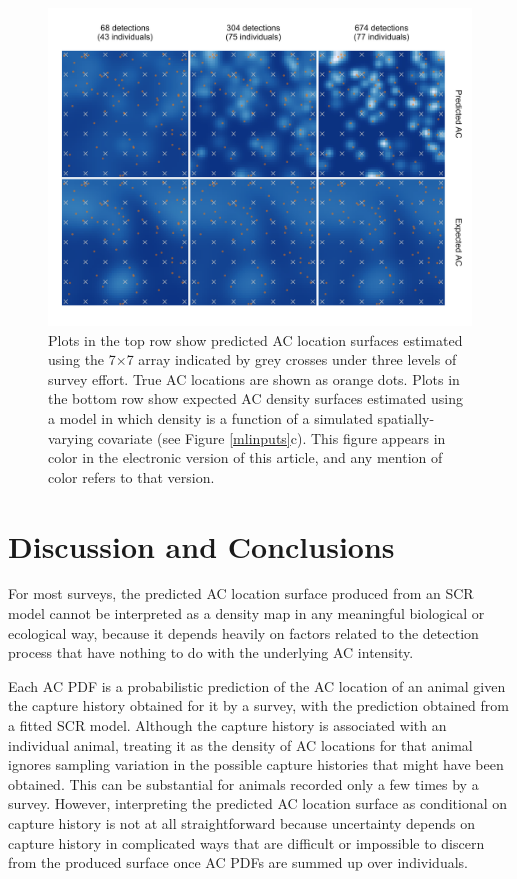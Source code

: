 \documentclass[useAMS,usenatbib,referee]{biom}
\begin{document}
\begin{figure}[htbp]
\centering
\includegraphics[width=1\textwidth]{mona_7x7.png}
\caption{Plots in the top row show predicted AC location surfaces estimated using the 7$\times$7 array indicated by grey crosses under three levels of survey effort. True AC locations are shown as orange dots. Plots in the bottom row show expected AC density surfaces estimated using a model in which density is a function of a simulated spatially-varying covariate (see Figure \ref{mlinputs}c). This figure appears in color in the electronic version of this article, and any mention of color refers to that version.}
\label{mona7x7}
\end{figure}

\section{Discussion and Conclusions} \label{discussion}
For most surveys, the predicted AC location surface produced from an SCR model cannot be interpreted as a density map in any meaningful biological or ecological way, because it depends heavily on factors related to the detection process that have nothing to do with the underlying AC intensity. 

Each AC PDF is a probabilistic prediction of the AC location of an animal given the capture history obtained for it by a survey, with the prediction obtained from a fitted SCR model. Although the capture history is associated with an individual animal, treating it as the density of AC locations for that animal ignores sampling variation in the possible capture histories that might have been obtained. This can be substantial for animals recorded only a few times by a survey. However, interpreting the predicted AC location surface as conditional on capture history is not at all straightforward because uncertainty depends on capture history in complicated ways that are difficult or impossible to discern from the produced surface once AC PDFs are summed up over individuals. 
\end{document}
